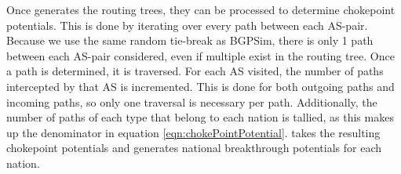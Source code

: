 \par Once \toolname{} generates the routing trees, they can be processed to
determine chokepoint potentials. This is done by iterating over every path
between each AS-pair. Because we use the same random tie-break as BGPSim, there
is only 1 path between each AS-pair considered, even if multiple exist in the
routing tree. Once a path is determined, it is traversed. For each AS visited,
the number of paths intercepted by that AS is incremented. This is done for
both outgoing paths and incoming paths, so only one traversal is necessary
per path. Additionally, the number of paths of each type that belong to each
nation is tallied, as this makes up the denominator in equation
\ref{eqn:chokePointPotential}.  \toolname{} takes the resulting chokepoint
potentials and generates national breakthrough potentials for each nation.
